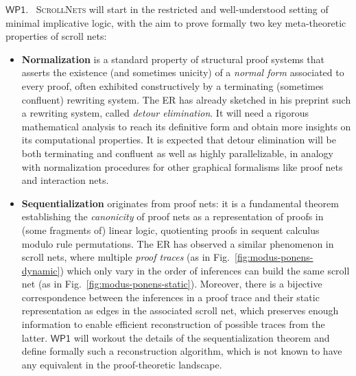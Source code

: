 \documentclass[11pt]{msca-pf}
\newcommand{\proj}{\small\textsc{ScrollNets}}
\newcommand{\WP}[1]{$\mathsf{WP#1}$}
\begin{document}
    \WP{1}.~ {\proj} will start in the restricted and well-understood setting of minimal
    implicative logic, with the aim to prove formally two key meta-theoretic properties of scroll
    nets:
    \begin{itemize}
        \item \textbf{Normalization} is a standard property of structural proof systems that asserts
        the existence (and sometimes unicity) of a \emph{normal form} associated to every proof,
        often exhibited constructively by a terminating (sometimes confluent) rewriting system. The
        ER has already sketched in his preprint such a rewriting system, called \emph{detour
        elimination}. It will need a rigorous mathematical analysis to reach its definitive form and
        obtain more insights on its computational properties. It is expected that detour elimination
        will be both terminating and confluent as well as highly parallelizable, in analogy with
        normalization procedures for other graphical formalisms like proof nets and interaction
        nets.

        \item \textbf{Sequentialization} originates from proof nets: it is a fundamental theorem establishing the
        \emph{canonicity} of proof nets as a representation of proofs in (some fragments of) linear
        logic, quotienting proofs in sequent calculus modulo rule permutations. The ER has observed a
        similar phenomenon in scroll nets, where multiple \emph{proof traces} (as in
        Fig.~\ref{fig:modus-ponens-dynamic}) which only vary in the order of inferences can build the
        same scroll net (as in Fig.~\ref{fig:modus-ponens-static}). Moreover, there is a bijective
        correspondence between the inferences in a proof trace and their static representation as edges
        in the associated scroll net, which preserves enough information to enable efficient
        reconstruction of possible traces from the latter. \WP{1} will workout the details of the
        sequentialization theorem and define formally such a reconstruction algorithm, which is not
        known to have any equivalent in the proof-theoretic landscape.
    \end{itemize}
    
\end{document}

